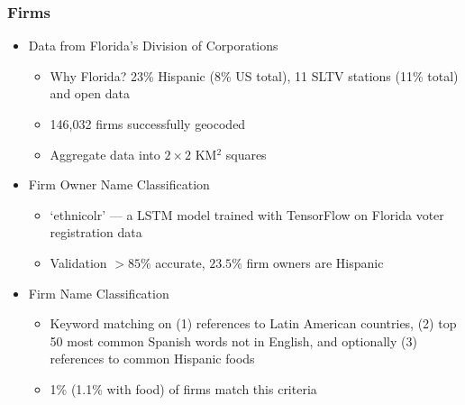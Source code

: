 \documentclass{beamer}
\begin{document}
\begin{frame}
\frametitle{Firms}

\begin{itemize}
\item Data from Florida's Division of Corporations
\begin{itemize}
\item Why Florida? 23\% Hispanic (8\% US total), 11 SLTV stations (11\% total) and open data
\item 146,032 firms successfully geocoded
\item Aggregate data into $2\times 2$ KM$^2$ squares
\end{itemize}
\item Firm Owner Name Classification
\begin{itemize}
\item `ethnicolr' --- a LSTM model trained with TensorFlow on Florida voter registration data
\item Validation $>85\%$ accurate, $23.5\%$ firm owners are Hispanic
\end{itemize}
\item Firm Name Classification
\begin{itemize}
\item Keyword matching on (1) references to Latin American countries, (2) top 50 most common Spanish words not in English, and optionally (3) references to common Hispanic foods
\item 1\% (1.1\% with food) of firms match this criteria
\end{itemize}
\end{itemize}
\end{frame}
\end{document}
